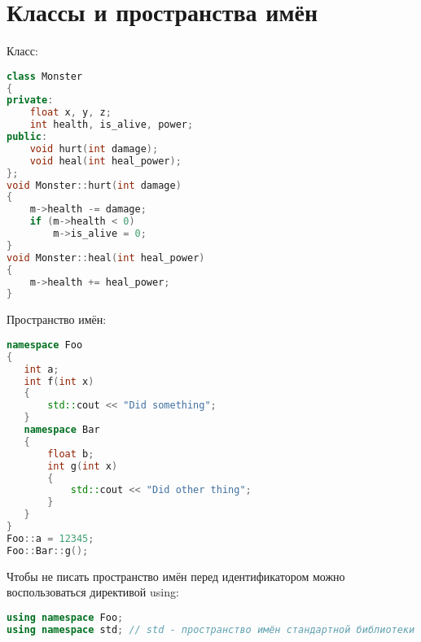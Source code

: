 \documentclass{article}
\begin{document}





\section{Классы и пространства имён}
\begin{multicols}{2}
Класс:
\begin{lstlisting}[language=C++,basicstyle=\ttfamily,keywordstyle=\color{blue}]
class Monster
{
private:
    float x, y, z;
    int health, is_alive, power;
public:
    void hurt(int damage);
    void heal(int heal_power);
};
void Monster::hurt(int damage)
{
    m->health -= damage;
    if (m->health < 0)
        m->is_alive = 0;
}
void Monster::heal(int heal_power)
{
    m->health += heal_power;
}
\end{lstlisting}
Пространство имён:
\begin{lstlisting}[language=C++,basicstyle=\ttfamily,keywordstyle=\color{blue}]
namespace Foo
{
   int a;
   int f(int x)
   {
       std::cout << "Did something";
   }
   namespace Bar
   {
       float b;
       int g(int x)
       {
           std::cout << "Did other thing";
       }
   }
}
Foo::a = 12345;
Foo::Bar::g();
\end{lstlisting}
\end{multicols}
Чтобы не писать пространство имён перед идентификатором можно воспользоваться директивой using:
\begin{lstlisting}[language=C++,basicstyle=\ttfamily,keywordstyle=\color{blue}]
using namespace Foo;
using namespace std; // std - пространство имён стандартной библиотеки
\end{lstlisting}
\end{document}
